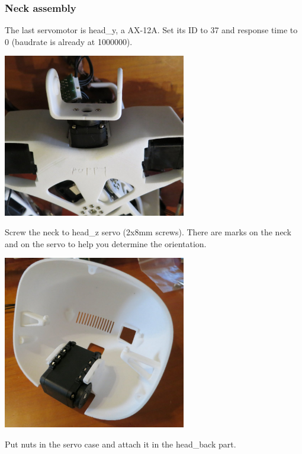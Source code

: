 \documentclass{article}
\begin{document}
\subsubsection{Neck assembly}

The last servomotor is head\_y, a AX-12A. Set its ID to 37 and response time to 0 (baudrate is already at 1000000).


 \begin{center}
  \includegraphics[width=0.6\textwidth]{img/neck1}
 \end{center}
 
 Screw the neck to head\_z servo (\diameter 2x8mm screws). There are marks on the neck and on the servo to help you determine the orientation.
 
 
 \begin{center}
  \includegraphics[width=0.6\textwidth]{img/neck2}
 \end{center}
 
 Put  nuts in the servo case and attach it in the head\_back part.
 
\end{document}
